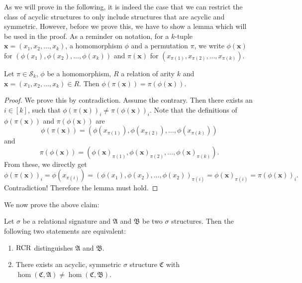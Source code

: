As we will prove in the following, it is indeed the case that we can restrict the class of acyclic structures to only include structures that are acyclic and symmetric.
However, before we prove this, we have to show a lemma which will be used in the proof.
As a reminder on notation, for a $k$-tuple $\mathbf x=(x_1,x_2,\dots,x_k)$, a homomorphism $\phi$ and a permutation $\pi$, we write $\phi(\mathbf x)$ for $(\phi(x_1),\phi(x_2),\dots,\phi(x_k))$ and $\pi(\mathbf x)$ for $(x_{\pi(1)},x_{\pi(2)},\dots,x_{\pi(k)})$.
\begin{lemma}
	Let $\pi\in\mathcal S_k$, $\phi$ be a homomorphism, $R$ a relation of arity $k$ and $\mathbf x=(x_1,x_2,\dots,x_k)\in R$.
	Then $\phi(\pi(\mathbf x))=\pi(\phi(\mathbf x))$.
	\label{HomAndPermutCommute}
\end{lemma}
\begin{proof}
	We prove this by contradiction.
	Assume the contrary.
	Then there exists an $i\in[k]$, such that $\phi(\pi(\mathbf x))_i\neq \pi(\phi(\mathbf x))_i$.
	Note that the definitions of $\phi(\pi(\mathbf x))$ and $\pi(\phi(\mathbf x))$ are 
	$$\phi(\pi(\mathbf x)) = (\phi(x_{\pi(1)}), \phi(x_{\pi(2)}),\dots,\phi(x_{\pi(k)}))$$
	and
	$$\pi(\phi(\mathbf x)) = (\phi(\mathbf x)_{\pi(1)},\phi(\mathbf x)_{\pi(2)},\dots,\phi(\mathbf x)_{\pi(k)}).$$
	From these, we directly get
	$$\phi(\pi(\mathbf x))_i=\phi(x_{\pi(i)})=(\phi(x_1),\phi(x_2),\dots,\phi(x_2))_{\pi(i)}=\phi(\mathbf x)_{\pi(i)}=\pi(\phi(\mathbf x))_i.$$
	Contradiction!
	Therefore the lemma must hold.
\end{proof}
We now prove the above claim:
\begin{theorem}
	\label{thm:ThmD}
	Let $\sigma$ be a relational signature and $\mathfrak A$ and $\mathfrak B$ be two $\sigma$ structures.
	Then the following two statements are equivalent:
	\begin{enumerate}
		\item $\operatorname{RCR}$ distinguishes $\mathfrak A$ and $\mathfrak B$.
		\item There exists an acyclic, symmetric $\sigma$ structure $\mathfrak C$ with $\hom(\mathfrak C,\mathfrak A)\neq \hom(\mathfrak C,\mathfrak B)$.
	\end{enumerate}
\end{theorem}
